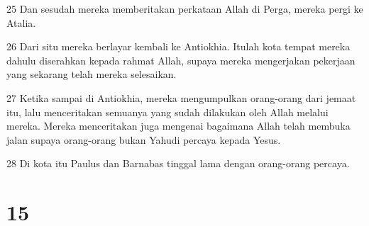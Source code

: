 \par 25 Dan sesudah mereka memberitakan perkataan Allah di Perga, mereka pergi ke Atalia.
\par 26 Dari situ mereka berlayar kembali ke Antiokhia. Itulah kota tempat mereka dahulu diserahkan kepada rahmat Allah, supaya mereka mengerjakan pekerjaan yang sekarang telah mereka selesaikan.
\par 27 Ketika sampai di Antiokhia, mereka mengumpulkan orang-orang dari jemaat itu, lalu menceritakan semuanya yang sudah dilakukan oleh Allah melalui mereka. Mereka menceritakan juga mengenai bagaimana Allah telah membuka jalan supaya orang-orang bukan Yahudi percaya kepada Yesus.
\par 28 Di kota itu Paulus dan Barnabas tinggal lama dengan orang-orang percaya.

\chapter{15}

